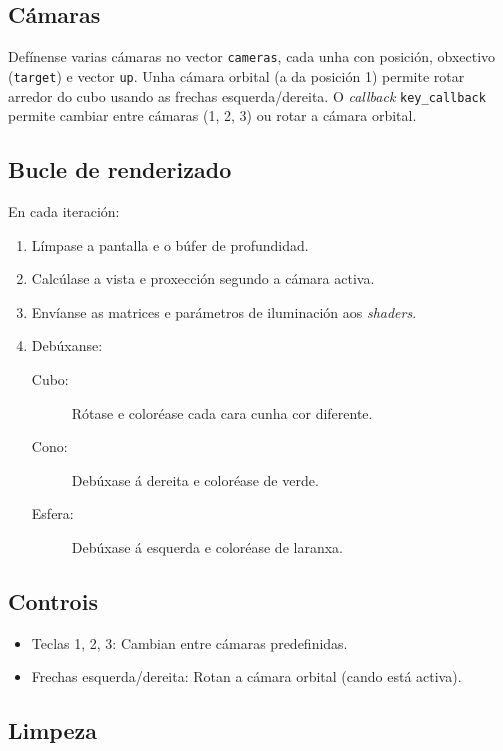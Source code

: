 \documentclass{article}
\begin{document}
\subsection{Cámaras}

Defínense varias cámaras no vector \texttt{cameras}, cada unha con posición, obxectivo (\texttt{target}) e vector \texttt{up}.
Unha cámara orbital (a da posición 1) permite rotar arredor do cubo usando as frechas esquerda/dereita.
O \textit{callback} \texttt{key\_callback} permite cambiar entre cámaras (1, 2, 3) ou rotar a cámara orbital.

\subsection{Bucle de renderizado}

En cada iteración:

\begin{enumerate}
\item Límpase a pantalla e o búfer de profundidad.
\item Calcúlase a vista e proxección segundo a cámara activa.
\item Envíanse as matrices e parámetros de iluminación aos \textit{shaders}.
\item Debúxanse:
	\begin{description}
		\item[Cubo:] Rótase e coloréase cada cara cunha cor diferente.
		\item[Cono:] Debúxase á dereita e coloréase de verde.
		\item[Esfera:] Debúxase á esquerda e coloréase de laranxa.
	\end{description}
\end{enumerate}

\subsection{Controis}

\begin{itemize}
	\item Teclas 1, 2, 3: Cambian entre cámaras predefinidas.
	\item Frechas esquerda/dereita: Rotan a cámara orbital (cando está activa).
\end{itemize}

\subsection{Limpeza}
\end{document}

